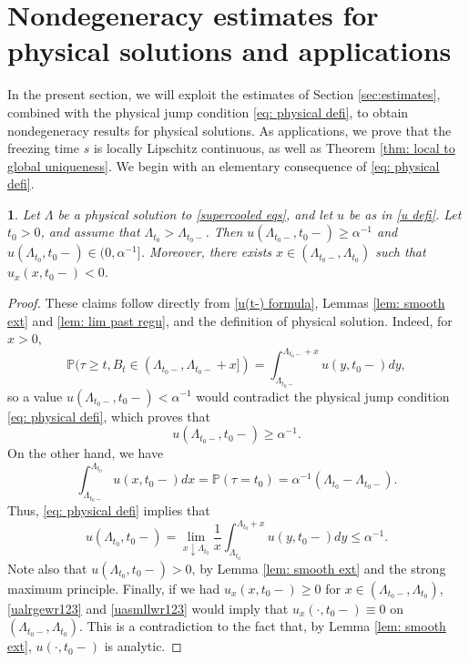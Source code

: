 \documentclass{article}
\numberwithin{equation}{section}
\numberwithin{figure}{section}
\theoremstyle{plain}
\theoremstyle{plain}
\theoremstyle{plain}
\theoremstyle{plain}
\newtheorem{lem}[thm]{\protect\lemmaname}
\theoremstyle{definition}
\theoremstyle{remark}
\def\P{{\mathbb{P}}}
\providecommand{\lemmaname}{Lemma}
\begin{document}
\section{Nondegeneracy estimates for physical solutions and applications} \label{sec: estimates physical}
In the present section, we will exploit the estimates of Section \ref{sec:estimates}, combined with the physical jump condition \eqref{eq: physical defi}, to obtain nondegeneracy results for physical solutions. As applications, we prove that the freezing time $s$ is locally Lipschitz continuous, as well as Theorem \ref{thm: local to global uniqueness}. 
We begin with an elementary consequence of \eqref{eq: physical defi}.
\begin{lem} \label{lem: u large jump} Let $\Lambda$ be a physical solution to \eqref{supercooled eqs}, and let $u$ be as in \eqref{u defi}. Let $t_0>0$, and assume that $\Lambda_{t_0}>\Lambda_{t_0-}$. Then $u(\Lambda_{t_0-},t_0-)\geq \alpha^{-1}$ and $u(\Lambda_{t_0},t_0-)\in (0, \alpha^{-1}]$. Moreover, there exists $x\in (\Lambda_{t_0-},\Lambda_{t_0})$ such that $u_x(x,t_0-)<0$.  
\end{lem}
\begin{proof} These claims follow directly from \eqref{u(t-) formula}, Lemmas \ref{lem: smooth ext} and \ref{lem: lim past regu}, and the definition of physical solution. Indeed, for $x>0$,
\begin{equation}
    \P(\tau \geq t, B_t\in (\Lambda_{t_0-},\Lambda_{t_0-}+x])=\int_{\Lambda_{t_0-}}^{\Lambda_{t_0-}+x}u(y,t_0-)dy,
\end{equation}
so a value $u(\Lambda_{t_0-},t_0-)<\alpha^{-1}$ would contradict the physical jump condition \eqref{eq: physical defi}, which proves that 
\begin{equation} \label{ualrgewr123}u(\Lambda_{t_0-},t_0-)\geq\alpha^{-1}.\end{equation} On the other hand, we have
\begin{equation} 
    \int_{\Lambda_{t_0-}}^{\Lambda_{t_0}}u(x,t_0-)dx=\P(\tau= t_0)=\alpha^{-1}(\Lambda_{t_0}-\Lambda_{t_0-}).
\end{equation}
Thus, \eqref{eq: physical defi} implies that 
\begin{equation} \label{uasmllwr123}
   u(\Lambda_{t_0},t_0-)=\lim_{x \downarrow \Lambda_{t_0}} \frac{1}{x}\int_{\Lambda_{t_0}}^{\Lambda_{t_0}+x}u(y,t_0-)dy \leq \alpha^{-1} .
\end{equation}
Note also that $u(\Lambda_{t_0},t_0-)>0$, by Lemma \ref{lem: smooth ext} and the strong maximum principle.
Finally, if we had $u_x(x,t_0-) \geq 0$ for $x\in (\Lambda_{t_0-},\Lambda_{t_0})$, \eqref{ualrgewr123} and \eqref{uasmllwr123} would imply that $u_x(\cdot ,t_0-) \equiv 0$ on  $(\Lambda_{t_0-},\Lambda_{t_0})$. This is a contradiction to the fact that, by Lemma \ref{lem: smooth ext}, $u(\cdot,t_0-)$ is analytic.
\end{proof}
\end{document}
